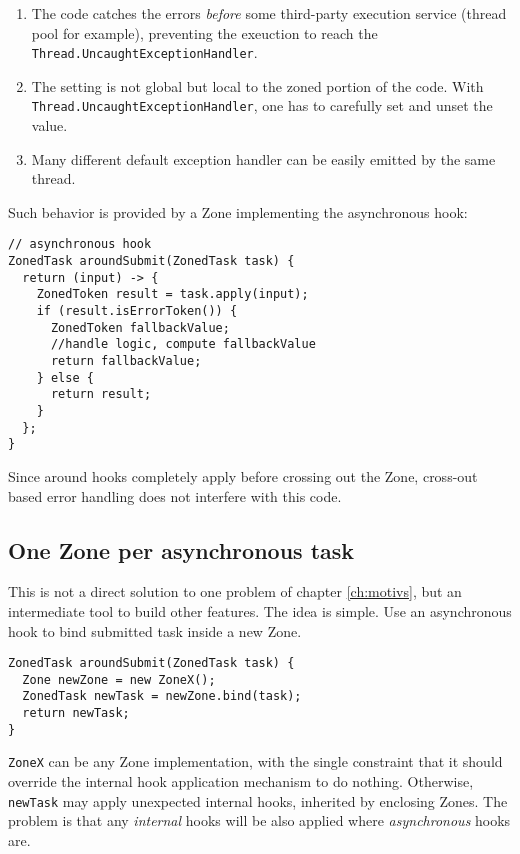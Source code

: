 \begin{enumerate}
\item The code catches the errors \emph{before} some third-party execution service (thread pool for example), preventing the exeuction to reach the \lstinline{Thread.UncaughtExceptionHandler}.
\item The setting is not global but local to the zoned portion of the code. With \lstinline{Thread.UncaughtExceptionHandler}, one has to carefully set and unset the value.
\item Many different default exception handler can be easily emitted by the same thread.
\end{enumerate}

Such behavior is provided by a Zone implementing the asynchronous hook:

\begin{lstlisting}
// asynchronous hook
ZonedTask aroundSubmit(ZonedTask task) {
  return (input) -> {
    ZonedToken result = task.apply(input);
    if (result.isErrorToken()) {
      ZonedToken fallbackValue;
      //handle logic, compute fallbackValue
      return fallbackValue;
    } else {
      return result;
    }
  };
}
\end{lstlisting}

Since around hooks completely apply before crossing out the Zone, cross-out based error handling does not interfere with this code.

\subsection*{One Zone per asynchronous task}

This is not a direct solution to one problem of chapter \ref{ch:motivs}, but an intermediate tool to build other features. The idea is simple. Use an asynchronous hook to bind submitted task inside a new Zone.

\begin{lstlisting}
ZonedTask aroundSubmit(ZonedTask task) {
  Zone newZone = new ZoneX();
  ZonedTask newTask = newZone.bind(task);
  return newTask;
}
\end{lstlisting}

\lstinline{ZoneX} can be any Zone implementation, with the single constraint that it should override the internal hook application mechanism to do nothing. Otherwise, \lstinline{newTask} may apply unexpected internal hooks, inherited by enclosing Zones. The problem is that any \emph{internal} hooks will be also applied where \emph{asynchronous} hooks are.

